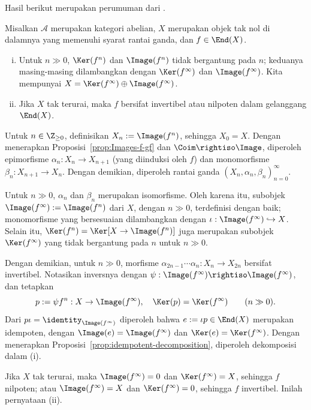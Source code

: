 Hasil berikut merupakan perumuman dari \cite[Lema 6.11.5]{Li1}.
\begin{lema}\label{prop:Abel-cat-Fitting}
	Misalkan $\mathcal{A}$ merupakan kategori abelian, $X$ merupakan objek tak
	nol di dalamnya yang memenuhi syarat rantai ganda, dan $f\in\End(X)$.
	\begin{enumerate}[(i)]
		\item Untuk $n\gg 0$, $\Ker(f^n)$ dan $\Image(f^n)$ tidak bergantung
		pada $n$; keduanya masing-masing dilambangkan dengan $\Ker(f^\infty)$
		dan $\Image(f^\infty)$. Kita mempunyai
		$X=\Ker(f^\infty)\oplus\Image(f^\infty)$.
		\item Jika $X$ tak terurai, maka $f$ bersifat invertibel atau nilpoten
		dalam gelanggang $\End(X)$.
	\end{enumerate}
\end{lema}
\begin{bukti}
	Untuk $n\in\Z_{\geq 0}$, definisikan $X_n:=\Image(f^n)$, sehingga
	$X_0=X$. Dengan menerapkan Proposisi~\ref{prop:Images-f-gf} dan
	$\Coim\rightiso\Image$, diperoleh epimorfisme
	$\alpha_n:X_n\to X_{n+1}$ (yang diinduksi oleh $f$) dan monomorfisme
	$\beta_n:X_{n+1}\to X_n$. Dengan demikian, diperoleh rantai ganda
	$(X_n,\alpha_n,\beta_n)_{n=0}^\infty$.

	Untuk $n\gg 0$, $\alpha_n$ dan $\beta_n$ merupakan isomorfisme. Oleh karena
	itu, subobjek $\Image(f^\infty):=\Image(f^n)$ dari $X$, dengan $n\gg 0$,
	terdefinisi dengan baik; monomorfisme yang bersesuaian dilambangkan dengan
	$\iota:\Image(f^\infty)\hookrightarrow X$. Selain itu,
	$\Ker(f^n)=\Ker[X\to\Image(f^n)]$ juga merupakan subobjek
	$\Ker(f^\infty)$ yang tidak bergantung pada $n$ untuk $n\gg 0$.

	Dengan demikian, untuk $n\gg 0$, morfisme
	$\alpha_{2n-1}\cdots\alpha_n:X_n\to X_{2n}$ bersifat invertibel. Notasikan
	inversnya dengan
	$\psi:\Image(f^\infty)\rightiso\Image(f^\infty)$, dan tetapkan
	\[ p := \psi f^n: X \to \Image(f^\infty), \quad \Ker(p) = \Ker(f^\infty) \qquad (n \gg 0). \]
	Dari $p\iota=\identity_{\Image(f^\infty)}$ diperoleh bahwa
	$e:=\iota p\in\End(X)$ merupakan idempoten, dengan
	$\Image(e)=\Image(f^\infty)$ dan $\Ker(e)=\Ker(f^\infty)$. Dengan
	menerapkan Proposisi~\ref{prop:idempotent-decomposition}, diperoleh
	dekomposisi dalam (i).

	Jika $X$ tak terurai, maka $\Image(f^\infty)=0$ dan
	$\Ker(f^\infty)=X$, sehingga $f$ nilpoten; atau
	$\Image(f^\infty)=X$ dan $\Ker(f^\infty)=0$, sehingga $f$ invertibel.
	Inilah pernyataan (ii).
\end{bukti}


